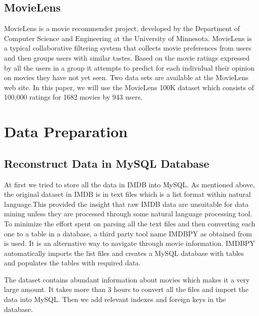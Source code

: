 \documentclass[conference]{IEEEtran}
\begin{document}
\subsection{MovieLens}
MovieLens is a movie recommender project, developed by the Department of Computer Science and Engineering at the University of Minnesota. MovieLens is a typical collaborative filtering system that collects movie preferences from users and then groups users with similar tastes. Based on the movie ratings expressed by all the users in a group it attempts to predict for each individual their opinion on movies they have not yet seen. Two data sets are available at the MovieLens web site\cite{movielens}. In this paper, we will use the MovieLens 100K dataset which consists of 100,000 ratings for 1682 movies by 943 users.


\section{Data Preparation}
\subsection{Reconstruct Data in MySQL Database}
At first we tried to store all the data in IMDB into MySQL. As mentioned above, the original dataset in IMDB is in text files which is a list format within natural language.This provided the insight that raw IMDB data are unsuitable for data mining unless they are processed through some natural language processing tool. To minimize the effort spent on parsing all the text files and then converting each one to a table in a database, a third party tool name IMDBPY as obtained from\cite{imdbpy} is used. It is an alternative way to navigate through movie information. IMDBPY automatically imports the list files and creates a MySQL database with tables and populates the tables with required data. 

The dataset contains abundant information about movies which makes it a very large amount. It takes more than 3 hours to convert all the files and import the data into MySQL. Then we add relevant indexes and foreign keys in the database.
\end{document}
